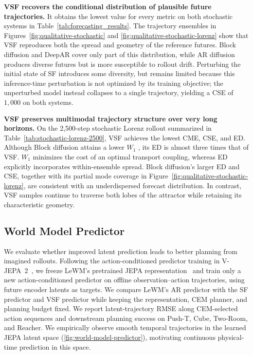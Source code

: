 \documentclass{article} %
\numberwithin{equation}{section}
\begin{document}
\textbf{VSF recovers the conditional distribution of plausible future
trajectories.} It obtains the lowest value for every metric on both stochastic
systems in Table~\ref{tab:forecasting_results}. The trajectory ensembles in
Figures~\ref{fig:qualitative-stochastic} and
\ref{fig:qualitative-stochastic-lorenz} show that VSF reproduces both the
spread and geometry of the reference futures. Block diffusion and DeepAR cover
only part of this distribution, while AR diffusion produces diverse futures
but is more susceptible to rollout drift. Perturbing the initial state of
SF introduces some diversity, but remains limited because this
inference-time perturbation is not optimized by its training objective; the
unperturbed model instead collapses to a single trajectory, yielding a CSE of
$1,000$ on both systems.

\textbf{VSF preserves multimodal trajectory structure over very long
horizons.} On the 2,500-step stochastic Lorenz rollout summarized in
Table~\ref{tab:stochastic-lorenz-2500}, VSF achieves the lowest CME,
CSE, and ED. Although Block diffusion attains a lower
$W_1$ , its ED is almost three times that of VSF. 
$W_1$ minimizes the cost of an optimal transport coupling, whereas ED explicitly incorporates within-ensemble spread. Block diffusion's larger ED and CSE, together with its partial mode coverage in Figure~\ref{fig:qualitative-stochastic-lorenz}, are consistent with an underdispersed forecast distribution. In contrast, VSF samples continue to
traverse both lobes of the attractor while retaining its characteristic
geometry.

\WFclear

\subsection{World Model Predictor} \label{sec:exp-world-model}

We evaluate whether improved latent prediction leads to better planning from
imagined rollouts. Following the action-conditioned predictor training in
V-JEPA~2~\citep{assran2025v}, we freeze LeWM's pretrained JEPA
representation~\citep{maes2026leworldmodel} and train only a new
action-conditioned predictor on offline observation--action trajectories,
using future encoder latents as targets. We compare LeWM's AR predictor with
the SF predictor and VSF predictor while keeping the representation, CEM
planner, and planning budget fixed. We report latent-trajectory RMSE along
CEM-selected action sequences and downstream planning success on Push-T, Cube,
Two-Room, and Reacher. We empirically observe smooth temporal trajectories in
the learned JEPA latent space
(\cref{fig:world-model-predictor}), motivating continuous physical-time
prediction in this space.
\end{document}
